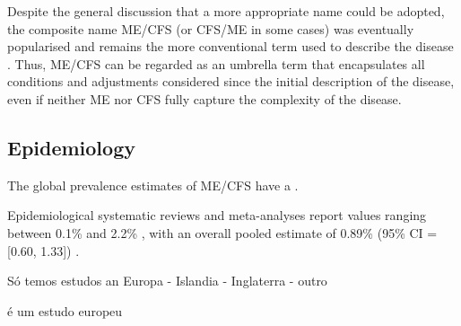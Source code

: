 Despite the general discussion that a more appropriate name could be adopted, the composite name ME/CFS (or CFS/ME in some cases) was eventually popularised and remains the more conventional term used to describe the disease \citep{carruthers2003MyalgicEncephalomyelitis}. Thus, ME/CFS can be regarded as an umbrella term that encapsulates all conditions and adjustments considered since the initial description of the disease, even if neither ME nor CFS fully capture the complexity of the disease.


\subsection{Epidemiology}
\label{subsec:epidemiology}

The global prevalence estimates of ME/CFS have a .

Epidemiological systematic reviews and meta-analyses report values ranging between 0.1\% and 2.2\% \citep{estevez-lopez2020SystematicReviewa}, with an overall pooled estimate of 0.89\% (95\% CI = [0.60, 1.33]) \citep{lim2020SystematicReviewa}.

Só temos estudos an Europa
- Islandia
- Inglaterra
- outro

\citet{estevez-lopez2020SystematicReviewa} é um estudo europeu

